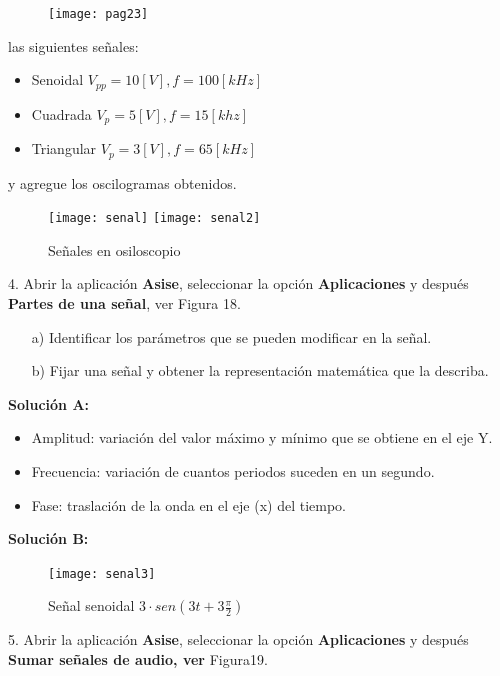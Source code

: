 \begin{figure}[h]
	\texttt{[image: pag23]}
\end{figure}

las siguientes señales:

\begin{itemize}
	\item Senoidal $V_{pp}=10[V],f=100[kHz]$
	\item Cuadrada $ V_{p}=5[V],f=15[khz] $
	\item Triangular $ V_{p}=3[V],f=65[kHz] $
\end{itemize} 

y agregue los oscilogramas obtenidos. 

\newpage


\begin{figure}[!h]
	\centering
	\texttt{[image: senal]}
	\texttt{[image: senal2]}
	\caption{Señales en osiloscopio}
\end{figure}


4. Abrir la aplicación \textbf{Asise}, seleccionar la opción \textbf{Aplicaciones} y después \textbf{Partes de una señal}, ver Figura 18.

\begin{itemize}
	\item[a)] Identificar los parámetros que se pueden modificar en la señal.
	\item[b)]  Fijar una señal y obtener la representación matemática que la describa.
\end{itemize}


\textbf{Solución A:}

\begin{itemize}
	\item Amplitud: variación del valor máximo y mínimo que se obtiene en el eje Y.
	\item Frecuencia: variación de cuantos periodos suceden en un segundo.
	\item Fase: traslación de la onda en el eje (x) del tiempo.
\end{itemize}

\textbf{Solución B:}

\begin{figure}[!h]
	\centering
	\texttt{[image: senal3]}
		\caption{ Señal senoidal $ 3 \cdot sen(3t+3\frac{\pi}{2}) $}
\end{figure}

5. Abrir la aplicación \textbf{Asise}, seleccionar la opción \textbf{Aplicaciones} y después \textbf{Sumar señales de audio, ver} Figura19.

